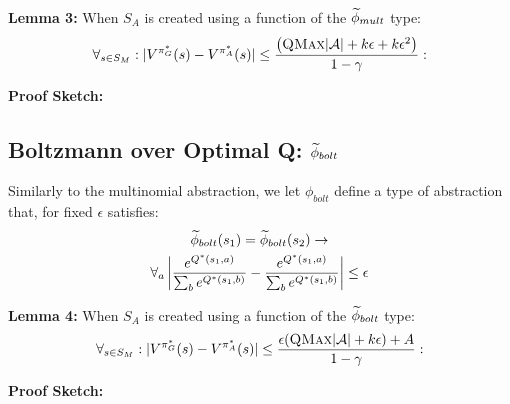 
{\bf Lemma 3:} When $S_A$ is created using a function of the $\widetilde \phi_{mult}$ type:
\begin{equation}
\forall_{s \in S_M} : | V^{\pi^*_G}(s) - V^{\pi^*_{A}}(s) | \leq \frac{\left(\textsc{QMax}|\mathcal{A}| + k \epsilon + k \epsilon^2\right)}{1-\gamma}:
\end{equation}

{\bf Proof Sketch:}



\subsection{Boltzmann over Optimal Q: $\widetilde \phi_{bolt}$}

Similarly to the multinomial abstraction, we let $\phi_{bolt}$ define a type of abstraction that, for fixed $\epsilon$ satisfies:
\begin{multline}
\widetilde \phi_{bolt}(s_1) = \widetilde \phi_{bolt}(s_2) \rightarrow \\
\forall_{a} \left|\frac{e^{Q^*(s_1,a)}}{\sum_b e^{Q^*(s_1,b)}} - \frac{e^{Q^*(s_1,a)}}{\sum_b e^{Q^*(s_1,b)}}\right| \leq \epsilon
\end{multline}

{\bf Lemma 4:} When $S_A$ is created using a function of the $\widetilde \phi_{bolt}$ type:
\begin{equation}
\forall_{s \in S_M} : | V^{\pi^*_G}(s) - V^{\pi^*_{A}}(s) | \leq \frac{\epsilon(\textsc{QMax}|\mathcal{A}| + k\epsilon) + A}{1-\gamma}:
\end{equation}

{\bf Proof Sketch:}












